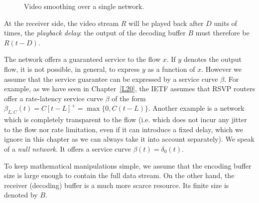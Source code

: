 \begin{figure}[hbt]
\caption{Video smoothing over a single network.}
\end{figure}




At the receiver side, the video stream $R$ will be played back after $D$ units of times, the {\em playback delay}: the output of the decoding buffer $B$ must therefore be $R(t-D)$.

The network offers a guaranteed service to the flow $x$. If $y$ denotes the output flow,
it is not possible, in general, to express $y$ as a function of $x$. However we assume that
the service guarantee can be expressed by a service curve $\beta$.
For example, as we have seen in Chapter~\ref{L20}, the IETF assumes that RSVP routers offer a rate-latency service curve $\beta$ of the form
$\beta_{L,C}(t) = C [t-L]^{+} = \max \{ 0, C(t-L) \} $.
Another example is a network which is completely transparent to the flow (i.e. which does not incur any jitter
to the flow nor rate limitation, even if it can introduce a fixed delay, which we ignore in this chapter as we can always take it into account separately).
We speak of a {\em null network}. It offers a service curve $\beta(t) = \delta_0(t)$.

To keep mathematical manipulations simple, we assume that the encoding buffer size is large enough to contain the full data stream.
On the other hand, the receiver (decoding) buffer is a much more scarce resource. Its finite size is denoted by $B$.


